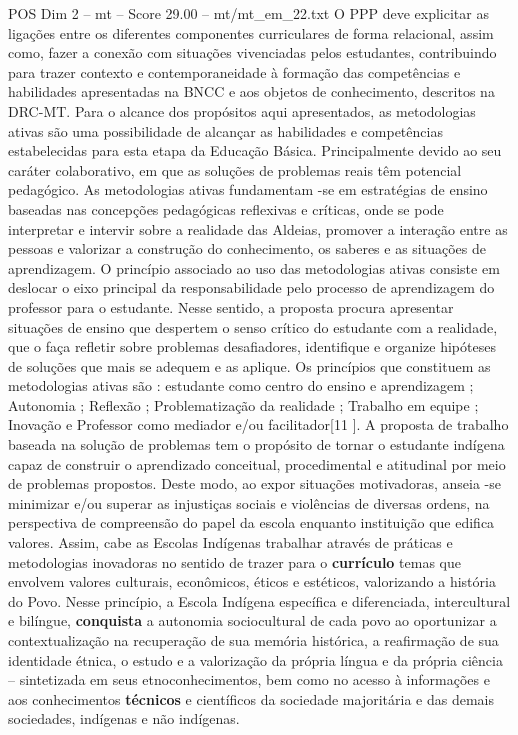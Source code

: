 \begin{textsample}{POS Dim 2 – mt – Score 29.00 – mt/mt\_em\_22.txt}
O PPP deve explicitar as ligações entre os diferentes componentes curriculares de forma relacional, assim como, fazer a conexão com situações vivenciadas pelos estudantes, contribuindo para trazer contexto e contemporaneidade à formação das competências e habilidades apresentadas na BNCC e aos objetos de conhecimento, descritos na DRC-MT.
Para o alcance dos propósitos aqui apresentados, as metodologias ativas são uma possibilidade de alcançar as habilidades e competências estabelecidas para esta etapa da Educação Básica.
Principalmente devido ao seu caráter colaborativo, em que as soluções de problemas reais têm potencial pedagógico.
As metodologias ativas fundamentam -se em estratégias de ensino baseadas nas concepções pedagógicas reflexivas e críticas, onde se pode interpretar e intervir sobre a realidade das Aldeias, promover a interação entre as pessoas e valorizar a construção do conhecimento, os saberes e as situações de aprendizagem.
O princípio associado ao uso das metodologias ativas consiste em deslocar o eixo principal da responsabilidade pelo processo de aprendizagem do professor para o estudante.
Nesse sentido, a proposta procura apresentar situações de ensino que despertem o senso crítico do estudante com a realidade, que o faça refletir sobre problemas desafiadores, identifique e organize hipóteses de soluções que mais se adequem e as aplique.
Os princípios que constituem as metodologias ativas são : estudante como centro do ensino e aprendizagem ; Autonomia ; Reflexão ; Problematização da realidade ; Trabalho em equipe ; Inovação e Professor como mediador e/ou facilitador[11 ].
A proposta de trabalho baseada na solução de problemas tem o propósito de tornar o estudante indígena capaz de construir o aprendizado conceitual, procedimental e atitudinal por meio de problemas propostos.
Deste modo, ao expor situações motivadoras, anseia -se minimizar e/ou superar as injustiças sociais e violências de diversas ordens, na perspectiva de compreensão do papel da escola enquanto instituição que edifica valores.
Assim, cabe as Escolas Indígenas trabalhar através de práticas e metodologias inovadoras no sentido de trazer para o \textbf{currículo} temas que envolvem valores culturais, econômicos, éticos e estéticos, valorizando a história do Povo.
Nesse princípio, a Escola Indígena específica e diferenciada, intercultural e bilíngue, \textbf{conquista} a autonomia sociocultural de cada povo ao oportunizar a contextualização na recuperação de sua memória histórica, a reafirmação de sua identidade étnica, o estudo e a valorização da própria língua e da própria ciência – sintetizada em seus etnoconhecimentos, bem como no acesso à informações e aos conhecimentos \textbf{técnicos} e científicos da sociedade majoritária e das demais sociedades, indígenas e não indígenas.

\end{textsample}
